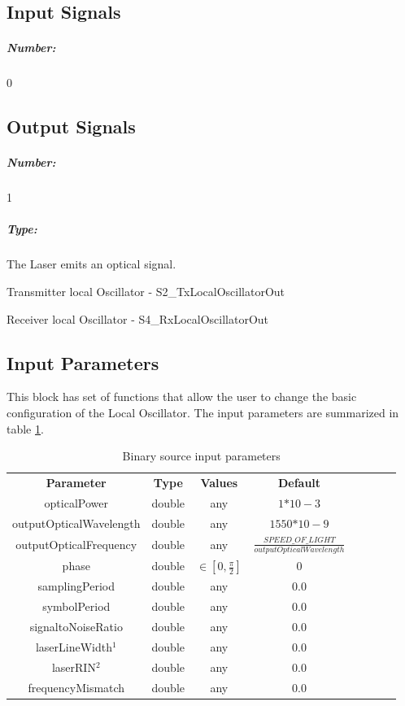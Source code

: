 \subsection*{Input Signals}

\subparagraph*{Number:} 0

\subsection*{Output Signals}

\subparagraph*{Number:} 1

\subparagraph*{Type:} The Laser emits an optical signal.\par
Transmitter local Oscillator - S2\_TxLocalOscillatorOut\par
Receiver local Oscillator - S4\_RxLocalOscillatorOut

\subsection*{Input Parameters}
This block has set of functions that allow the user to change the basic configuration of the Local Oscillator. The input parameters are summarized in table \ref{table:LO_in_par}.
\begin{table}[H]
	\centering
	\begin{tabular}{|c|c|c|c|cccc}
		\cline{1-4}
		\textbf{Parameter} & \textbf{Type} & \textbf{Values} &   \textbf{Default}& \\ \cline{1-4}
		opticalPower & double & any & $1\text{*10}-3$ \\ \cline{1-4}
		outputOpticalWavelength & double & any & $1550\text{*10}-9$ \\ \cline{1-4}
		outputOpticalFrequency & double & any &  $\frac{SPEED\_OF\_LIGHT}{outputOpticalWavelength} $ \\ \cline{1-4}
		phase & double & $\in \left[0,\frac{\pi}{2}\right]$ & $0$ \\ \cline{1-4}
		samplingPeriod & double & any & $0.0$ \\ \cline{1-4}
        symbolPeriod   & double & any & $0.0$ \\ \cline{1-4}
        signaltoNoiseRatio & double & any & $0.0$ \\ \cline{1-4}
        laserLineWidth$^1$ & double & any & $0.0$ \\ \cline{1-4}
        laserRIN$^2$      & double & any & $0.0$ \\ \cline{1-4}
        frequencyMismatch & double & any & $0.0$ \\ \cline{1-4}
	\end{tabular}
	\caption{Binary source input parameters}
	\label{table:LO_in_par}
\end{table}


